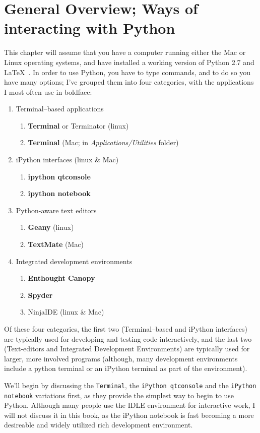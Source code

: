 \section{General Overview; Ways of interacting with Python}
\label{sec:overview}
This chapter will assume that you have a computer running either the Mac or Linux operating systems, and have installed a working version of Python 2.7 and \LaTeX\ . In order to use Python, you have to type commands, and to do so you have many options; I've grouped them into four categories, with the applications I most often use in boldface: 
\begin{enumerate}
\item Terminal--based applications
\begin{enumerate}
	\item \textbf{Terminal} or Terminator (linux)
	\item \textbf{Terminal} (Mac; in \textit{Applications/Utilities} folder)
\end{enumerate}
\item iPython interfaces (linux \& Mac)
\begin{enumerate}
	\item \textbf{ipython qtconsole}
	\item \textbf{ipython notebook}
\end{enumerate}
\item Python-aware text editors
\begin{enumerate}
	\item \textbf{Geany} (linux)
	\item \textbf{TextMate} (Mac)
\end{enumerate}
\item Integrated development environments
\begin{enumerate}
	\item\textbf{Enthought Canopy}
	\item \textbf{Spyder}
	\item NinjaIDE (linux \& Mac)
\end{enumerate}
\end{enumerate}	
Of these four categories, the first two (Terminal--based and iPython interfaces) are typically used for developing and testing code interactively, and the last two (Text-editors and Integrated Development Environments) are typically used for larger, more involved programs (although, many development environments include a python terminal or an iPython terminal as part of the environment).

We'll begin by discussing the \texttt{Terminal}, the \texttt{iPython qtconsole} and the \texttt{iPython notebook} variations first, as they provide the simplest way to begin to use Python. Although many people use the IDLE environment for interactive work, I will not discuss it in this book, as the iPython notebook is fast becoming a more desireable and widely utilized rich development environment. 

